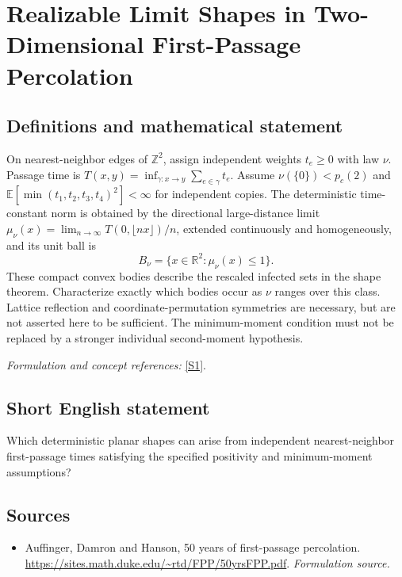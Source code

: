 \documentclass[11pt]{article}
\begin{document}
\section*{\texorpdfstring{Realizable Limit Shapes in Two-Dimensional First-Passage Percolation}{Realizable Limit Shapes in Two-Dimensional First-Passage Percolation}}\label{statement}
\subsection{Definitions and mathematical statement}
On nearest-neighbor edges of ${\mathbb{Z}}^2$, assign independent weights $t_e\ge0$ with law $\nu$. Passage time is $T(x,y)=\inf_{\gamma:x\to y}\sum_{e\in\gamma}t_e$. Assume $\nu(\{0\})<p_c(2)$ and ${\mathbb{E}}[\min(t_1,t_2,t_3,t_4)^2]<\infty$ for independent copies. The deterministic time-constant norm is obtained by the directional large-distance limit $\mu_\nu(x)=\lim_{n\to\infty}T(0,\lfloor nx\rfloor)/n$, extended continuously and homogeneously, and its unit ball is
\[
 B_\nu=\{x\in{\mathbb{R}}^2:\mu_\nu(x)\le1\}.
\]
These compact convex bodies describe the rescaled infected sets in the shape theorem. Characterize exactly which bodies occur as $\nu$ ranges over this class. Lattice reflection and coordinate-permutation symmetries are necessary, but are not asserted here to be sufficient. The minimum-moment condition must not be replaced by a stronger individual second-moment hypothesis.
\par\smallskip\textit{Formulation and concept references:} \href{https://sites.math.duke.edu/~rtd/FPP/50yrsFPP.pdf}{[S1]}.

\subsection{Short English statement}
Which deterministic planar shapes can arise from independent nearest-neighbor first-passage times satisfying the specified positivity and minimum-moment assumptions?
\subsection{Sources}
\begin{itemize}
\item[S1]Auffinger, Damron and Hanson, 50 years of first-passage percolation.
\url{https://sites.math.duke.edu/~rtd/FPP/50yrsFPP.pdf}.
\textit{Formulation source.}
\end{itemize}
\end{document}
